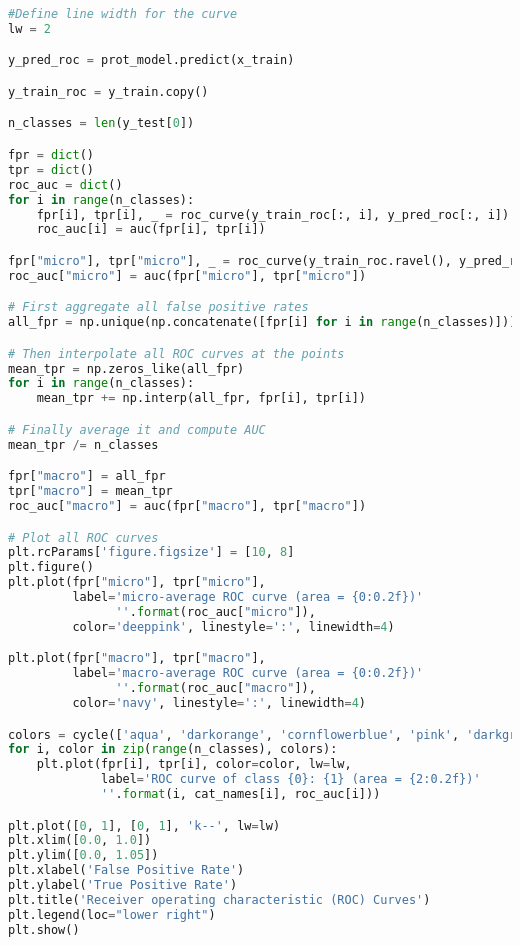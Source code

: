 \documentclass[12pt,letterpaper,oneside,reqno]{book}
\theoremstyle{plain}
\theoremstyle{definition}
\theoremstyle{plain}
\theoremstyle{remark}
\theoremstyle{plain}
\theoremstyle{definition}
\theoremstyle{plain}
\begin{document}
\begin{lstlisting}[language=Python, caption={ROC Curve Generation Code}, label=lst:roc_curve, frame=single]
#Define line width for the curve
lw = 2

y_pred_roc = prot_model.predict(x_train)

y_train_roc = y_train.copy()

n_classes = len(y_test[0])

fpr = dict()
tpr = dict()
roc_auc = dict()
for i in range(n_classes):
    fpr[i], tpr[i], _ = roc_curve(y_train_roc[:, i], y_pred_roc[:, i])
    roc_auc[i] = auc(fpr[i], tpr[i])

fpr["micro"], tpr["micro"], _ = roc_curve(y_train_roc.ravel(), y_pred_roc.ravel())
roc_auc["micro"] = auc(fpr["micro"], tpr["micro"])

# First aggregate all false positive rates
all_fpr = np.unique(np.concatenate([fpr[i] for i in range(n_classes)]))

# Then interpolate all ROC curves at the points
mean_tpr = np.zeros_like(all_fpr)
for i in range(n_classes):
    mean_tpr += np.interp(all_fpr, fpr[i], tpr[i])

# Finally average it and compute AUC
mean_tpr /= n_classes

fpr["macro"] = all_fpr
tpr["macro"] = mean_tpr
roc_auc["macro"] = auc(fpr["macro"], tpr["macro"])

# Plot all ROC curves
plt.rcParams['figure.figsize'] = [10, 8]
plt.figure()
plt.plot(fpr["micro"], tpr["micro"],
         label='micro-average ROC curve (area = {0:0.2f})'
               ''.format(roc_auc["micro"]),
         color='deeppink', linestyle=':', linewidth=4)

plt.plot(fpr["macro"], tpr["macro"],
         label='macro-average ROC curve (area = {0:0.2f})'
               ''.format(roc_auc["macro"]),
         color='navy', linestyle=':', linewidth=4)

colors = cycle(['aqua', 'darkorange', 'cornflowerblue', 'pink', 'darkgreen', 'maroon', 'olive'])
for i, color in zip(range(n_classes), colors):
    plt.plot(fpr[i], tpr[i], color=color, lw=lw,
             label='ROC curve of class {0}: {1} (area = {2:0.2f})'
             ''.format(i, cat_names[i], roc_auc[i]))

plt.plot([0, 1], [0, 1], 'k--', lw=lw)
plt.xlim([0.0, 1.0])
plt.ylim([0.0, 1.05])
plt.xlabel('False Positive Rate')
plt.ylabel('True Positive Rate')
plt.title('Receiver operating characteristic (ROC) Curves')
plt.legend(loc="lower right")
plt.show()
\end{lstlisting}
\end{document}

